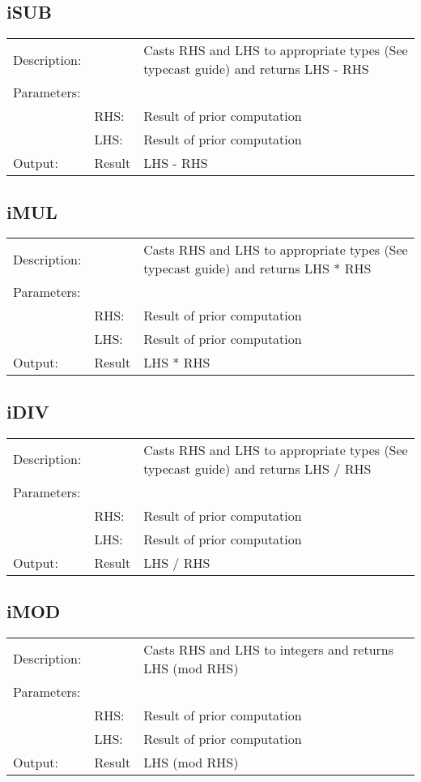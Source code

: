 \documentclass{standalone}
\begin{document}
\subsection{iSUB}
\begin{tabular}{l l p{10cm}}
Description: & ~    & Casts RHS and LHS to appropriate types (See typecast guide) and returns LHS - RHS\\
Parameters:  & ~ & ~ \\
~			 & RHS: & Result of prior computation\\
~			 & LHS: & Result of prior computation\\
Output:      & Result & LHS - RHS\\
\end{tabular}

\subsection{iMUL}
\begin{tabular}{l l p{10cm}}
Description: & ~    & Casts RHS and LHS to appropriate types (See typecast guide) and returns LHS * RHS\\
Parameters:  & ~ & ~ \\
~			 & RHS: & Result of prior computation\\
~			 & LHS: & Result of prior computation\\
Output:      & Result & LHS * RHS\\
\end{tabular}

\subsection{iDIV}
\begin{tabular}{l l p{10cm}}
Description: & ~    & Casts RHS and LHS to appropriate types (See typecast guide) and returns LHS / RHS\\
Parameters:  & ~ & ~ \\
~			 & RHS: & Result of prior computation\\
~			 & LHS: & Result of prior computation\\
Output:      & Result & LHS / RHS\\
\end{tabular}

\subsection{iMOD}
\begin{tabular}{l l p{10cm}}
Description: & ~    & Casts RHS and LHS to integers and returns LHS (mod RHS)\\
Parameters:  & ~ & ~ \\
~			 & RHS: & Result of prior computation\\
~			 & LHS: & Result of prior computation\\
Output:      & Result & LHS (mod RHS)\\
\end{tabular}
\end{document}
